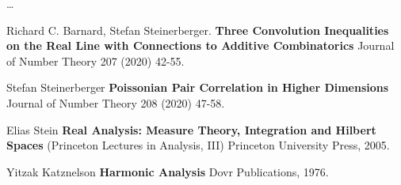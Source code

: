 \documentclass[12pt]{article}
\begin{document}
\newpage 

\noindent \dots 

\vfill



\begin{thebibliography}{}
\item Richard C. Barnard, Stefan Steinerberger.  \textbf{Three Convolution Inequalities on the Real Line with Connections to Additive Combinatorics} Journal of Number Theory 207 (2020) 42-55.

\item Stefan Steinerberger \textbf{Poissonian Pair Correlation in Higher Dimensions} \\ Journal of Number Theory 208 (2020) 47-58.
\item Elias Stein \textbf{Real Analysis: Measure Theory, Integration and Hilbert Spaces} (Princeton Lectures in Analysis, III) Princeton University Press, 2005.
\item Yitzak Katznelson \textbf{Harmonic Analysis} Dovr Publications, 1976.
\end{thebibliography}
\end{document}
